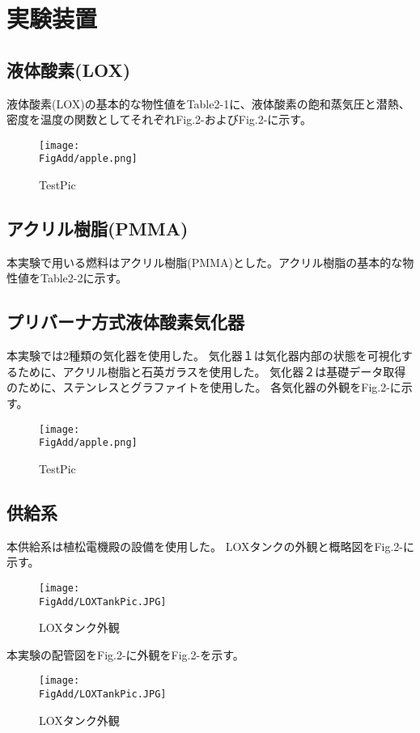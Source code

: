 \section{実験装置}
\subsection{液体酸素(LOX)}
液体酸素(LOX)の基本的な物性値をTable2-1に、液体酸素の飽和蒸気圧と潜熱、密度を温度の関数としてそれぞれFig.2-およびFig.2-に示す。
\begin{figure}[htbp]
\centering
\texttt{[image: \\FigAdd/apple.png]}
\caption{TestPic}
\end{figure}
\subsection{アクリル樹脂(PMMA)}
本実験で用いる燃料はアクリル樹脂(PMMA)とした。アクリル樹脂の基本的な物性値をTable2-2に示す。

\subsection{プリバーナ方式液体酸素気化器}
本実験では2種類の気化器を使用した。
気化器１は気化器内部の状態を可視化するために、アクリル樹脂と石英ガラスを使用した。
気化器２は基礎データ取得のために、ステンレスとグラファイトを使用した。
各気化器の外観をFig.2-に示す。
\begin{figure}
\centering
\texttt{[image: \\FigAdd/apple.png]}
\caption{TestPic}
\end{figure}

\subsection{供給系}
本供給系は植松電機殿の設備を使用した。
LOXタンクの外観と概略図をFig.2-に示す。

\begin{figure}
\centering
\texttt{[image: \\FigAdd/LOXTankPic.JPG]}
\caption{LOXタンク外観}
\end{figure}

本実験の配管図をFig.2-に外観をFig.2-を示す。

\begin{figure}
\centering
\texttt{[image: \\FigAdd/LOXTankPic.JPG]}
\caption{LOXタンク外観}
\end{figure}

%
